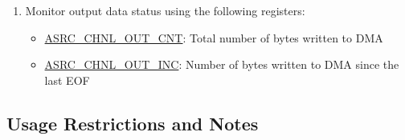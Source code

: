 \documentclass[main\_\_EN.tex]{subfiles}
\begin{document}
\begin{enumerate}
For details, refer to section \ref{subsec:input-output-len} \textit{}.

  \item Monitor output data status using the following registers:

  \begin{itemize}
    \item \hyperref[regdesc:ASRCCHNL0OUTCNTREG]{ASRC\_CHNL\_OUT\_CNT}: Total number of bytes written to DMA
    \item \hyperref[regdesc:ASRCCHNL0TRACE1REG]{ASRC\_CHNL\_OUT\_INC}: Number of bytes written to DMA since the last EOF
  \end{itemize}

\end{enumerate}


\subsection{Usage Restrictions and Notes}
\label{subsec:usage-note}
\end{document}
